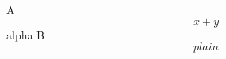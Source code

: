 \documentclass{article}
\begin{document}
A \begin{equation}
x+y
\end{equation}alpha B
\[
plain
\]
\end{document}
